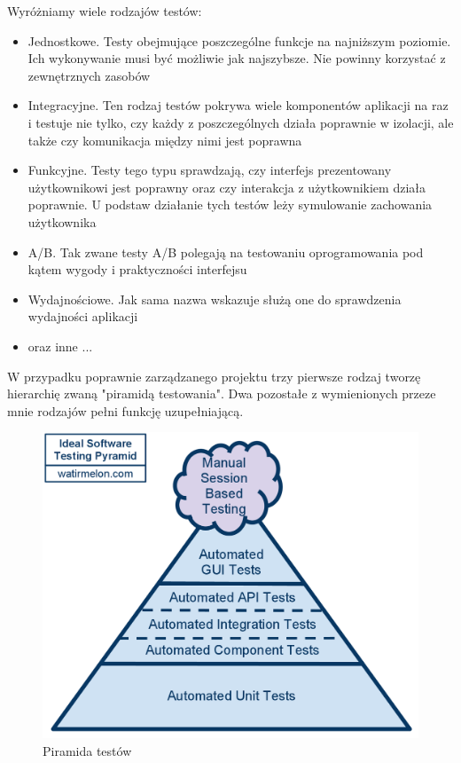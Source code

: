 \documentclass[brudnopis]{xmgr}
\begin{document}
Wyróżniamy wiele rodzajów testów:
\begin{itemize}
  \item Jednostkowe. Testy obejmujące poszczególne funkcje na najniższym poziomie. Ich wykonywanie musi być możliwie jak najszybsze. Nie powinny korzystać z zewnętrznych zasobów
  \item Integracyjne. Ten rodzaj testów pokrywa wiele komponentów aplikacji na raz i testuje nie tylko, czy każdy z poszczególnych działa poprawnie w izolacji, ale także czy komunikacja między nimi jest poprawna
  \item Funkcyjne. Testy tego typu sprawdzają, czy interfejs prezentowany użytkownikowi jest poprawny oraz czy interakcja z użytkownikiem działa poprawnie. U podstaw działanie tych testów leży symulowanie zachowania użytkownika
  \item A/B. Tak zwane testy A/B polegają na testowaniu oprogramowania pod kątem wygody i praktyczności interfejsu
  \item Wydajnościowe. Jak sama nazwa wskazuje służą one do sprawdzenia wydajności aplikacji
  \item oraz inne ...
\end{itemize}

W przypadku poprawnie zarządzanego projektu trzy pierwsze rodzaj tworzę hierarchię zwaną "piramidą testowania". Dwa pozostałe z wymienionych przeze mnie rodzajów pełni funkcję uzupełniającą. 

\begin{figure}[p]
    \centering
    \includegraphics[scale=0.25]{idealautomatedtestingpyramid.png}
    \caption{Piramida testów}
    \label{fig:pyramis}
\end{figure}
\end{document}

